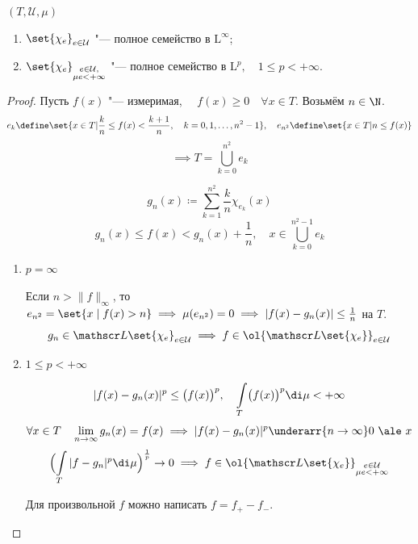 \begin{theorem}
	$ (T, \mathcal U, \mu) $

	\begin{enumerate}
		\item $ \set{\chi_e}_{e \in \mathcal U} $ "--- полное семейство в $ \mathrm L^\infty $;
		\item $ \set{\chi_e}_{
				\begin{subarray}{c}
					e \in \mathcal U, \\
					\mu e < +\infty
				\end{subarray}} $ "--- полное семейство в $ \mathrm L^p, \quad 1 \le p < +\infty $.
	\end{enumerate}
\end{theorem}

\begin{proof}
	Пусть $ f(x) $ "--- измеримая, $ \quad f(x) \ge 0 \quad \forall x \in T $.
	Возьмём $ n \in \N $.
	$$ e_k \define \set{x \in T | \frac k n \le f(x) < \frac{k + 1}n, \quad
	k = 0, 1, \dots, n^2 - 1}, \quad e_{n^2} \define \set{x \in T | n \le f(x)} $$
	$$ \implies T = \bigcup_{k = 0}^{n^2} e_k $$

	$$ g_n(x) \coloneq \sum_{k = 1}^{n^2} \frac k n \chi_{e_k}(x) $$
	$$ g_n(x) \le f(x) < g_n(x) + \frac1n, \quad x \in \bigcup_{k = 0}^{n^2 - 1} e_k $$

	\begin{enumerate}
		\item $ p = \infty $

			Если $ n > \|f\|_\infty $, то $ e_{n^2} = \set{x \mid f(x) > n} \implies \mu(e_{n^2}) = 0 \implies |f(x) - g_n(x)| \le \frac1n $ \ale на $ T $.
			$$ g_n \in \mathscr L\set{\chi_e}_{e \in \mathcal U} \implies f \in \ol{\mathscr L\set{\chi_e}}_{e \in \mathcal U} $$
		\item $ 1 \le p < +\infty $

			$$ |f(x) - g_n(x)|^p \le \bigl( f(x) \bigr)^p, \quad \int\limits_T \bigl( f(x) \bigr)^p \di \mu < +\infty $$
			$$ \forall x \in T \quad \lim\limits_{n \to \infty} g_n(x) = f(x) \implies |f(x) - g_n(x)|^p \underarr{n \to \infty} 0 ~\ale~ x $$
			$$ \Bigl( \int\limits_T |f - g_n|^p \di \mu \Bigr)^{\frac1p} \to 0 \implies
			f \in \ol{\mathscr L\set{\chi_e}}_{
				\begin{subarray}{c}
					e \in \mathcal U \\
					\mu e < +\infty
				\end{subarray}} $$

			Для произвольной $ f $ можно написать $ f = f_+ - f_- $.
	\end{enumerate}
\end{proof}

